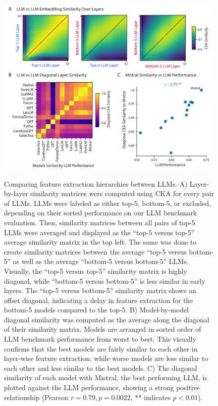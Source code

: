\begin{figure}[!t]
  \centering
  {\includegraphics[width=0.95\linewidth]{figures/Figure_good-vs-bad-vs-good-imshow-1x3plots-01.png}}
  \caption{Comparing feature extraction hierarchies between LLMs. A) Layer-by-layer similarity matrices were computed using CKA for every pair of LLMs. LLMs were labeled as either top-5, bottom-5, or excluded, depending on their sorted performance on our LLM benchmark evaluation. Then, similarity matrices between all pairs of top-5 LLMs were averaged and displayed as the ``top-5 versus top-5'' average similarity matrix in the top left. The same was done to create similarity matrices between the average ``top-5 versus bottom-5'' as well as the average ``bottom-5 versus bottom-5'' LLMs. Visually, the ``top-5 versus top-5'' similarity matrix is highly diagonal, while ``bottom-5 versus bottom-5'' is less similar in early layers. The ``top-5 versus bottom-5'' similarity matrix shows an offset diagonal, indicating a delay in feature extraction for the bottom-5 models compared to the top-5. B) Model-by-model diagonal similarity was computed as the average along the diagonal of their similarity matrix. Models are arranged in sorted order of LLM benchmark performance from worst to best. This visually confirms that the best models are fairly similar to each other in layer-wise feature extraction, while worse models are less similar to each other and less similar to the best models. C) The diagonal similarity of each model with Mistral, the best performing LLM, is plotted against the LLM performance, showing a strong positive relationship (Pearson $r=0.79, p=0.0022$, ** indicates $p<0.01$).}
  \label{fig:4}
\end{figure}

